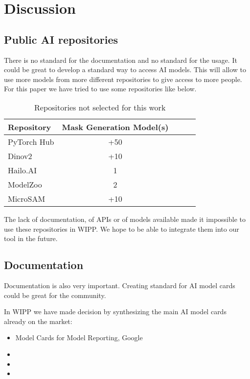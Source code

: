 \section{Discussion}
\label{sec:discussion}

\subsection{Public AI repositories}

There is no standard for the documentation and no standard for the usage.
It could be great to develop a standard
way to access AI models. This will allow to use more models from more different
repositories to give access to more people. For this paper we have tried to use
some repositories like below.

\begin{table}[H]
    \centering
    \caption{\label{tab:discussion}%
        Repositories not selected for this work
    }
    \begin{tabular}{lcccc}
      \toprule
      Repository & Mask Generation Model(s) \\
      \midrule
      PyTorch Hub & +50 \\
      Dinov2 & +10 \\
      Hailo.AI & 1 \\
      ModelZoo & 2 \\
      MicroSAM & +10 \\
      \bottomrule
    \end{tabular}
\end{table}

The lack of documentation, of APIs or of models available made it impossible to
use these repositories in WIPP. We hope to be able to integrate them into our
tool in the future.

\subsection{Documentation}

Documentation is also very important. Creating standard for AI model cards
could be great for the community.

In WIPP we have made decision by synthesizing the main AI model cards
already on the market:
\begin{itemize}
    \item Model Cards for Model Reporting, Google \cite{DBLP:journals/corr/abs-1810-03993}
    \item 
    \item 
    \item 
\end{itemize}



